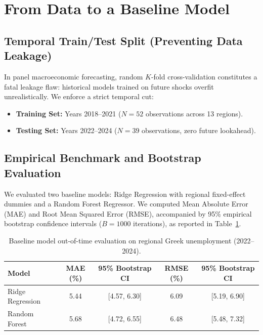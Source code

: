 \documentclass[11pt,a4paper]{article}
\begin{document}
\section{From Data to a Baseline Model}
\subsection{Temporal Train/Test Split (Preventing Data Leakage)}
In panel macroeconomic forecasting, random $K$-fold cross-validation constitutes a fatal leakage flaw: historical models trained on future shocks overfit unrealistically. We enforce a strict temporal cut:
\begin{itemize}
    \item \textbf{Training Set:} Years 2018--2021 ($N = 52$ observations across 13 regions).
    \item \textbf{Testing Set:} Years 2022--2024 ($N = 39$ observations, zero future lookahead).
\end{itemize}

\subsection{Empirical Benchmark and Bootstrap Evaluation}
We evaluated two baseline models: Ridge Regression with regional fixed-effect dummies and a Random Forest Regressor. We computed Mean Absolute Error (MAE) and Root Mean Squared Error (RMSE), accompanied by 95\% empirical bootstrap confidence intervals ($B = 1000$ iterations), as reported in Table~\ref{tab:results}.

\begin{table}[ht]\centering\small
\caption{Baseline model out-of-time evaluation on regional Greek unemployment (2022--2024).}\label{tab:results}
\begin{tabular}{@{}lcccc@{}}\toprule
\textbf{Model} & \textbf{MAE (\%)} & \textbf{95\% Bootstrap CI} & \textbf{RMSE (\%)} & \textbf{95\% Bootstrap CI}\\\midrule
Ridge Regression & 5.44 & [4.57, 6.30] & 6.09 & [5.19, 6.90]\\
Random Forest & 5.68 & [4.72, 6.55] & 6.48 & [5.48, 7.32]\\\bottomrule
\end{tabular}
\end{table}
\end{document}
